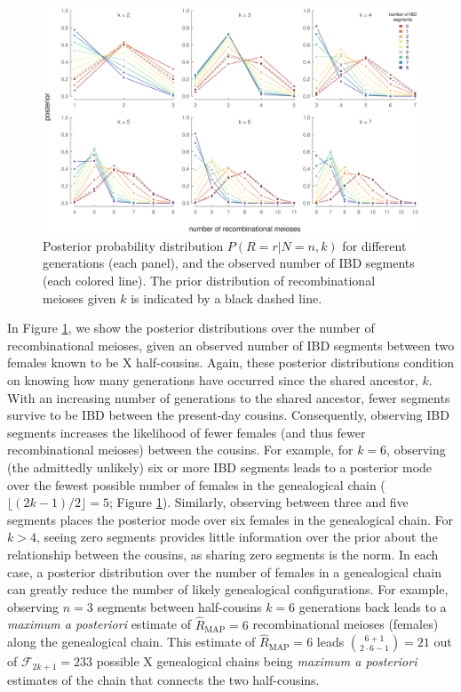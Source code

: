 \documentclass[11pt]{article}
\begin{document}
\begin{figure}[!ht]

  \includegraphics[width=\textwidth]{images/rm-posterior}

  \caption{Posterior probability distribution $P(R = r | N = n, k)$ for
different generations (each panel), and the observed number of IBD segments
(each colored line). The prior distribution of recombinational meioses given
$k$ is indicated by a black dashed line.}

  \label{fig:inference}

\end{figure}

In Figure \ref{fig:inference}, we show the posterior distributions over the
number of recombinational meioses, given an observed number of IBD segments
between two females known to be X half-cousins. Again, these posterior
distributions condition on knowing how many generations have occurred since the
shared ancestor, $k$.  With an increasing number of generations to the shared
ancestor, fewer segments survive to be IBD between the present-day cousins.
Consequently, observing IBD segments increases the likelihood of fewer females
(and thus fewer recombinational meioses) between the cousins. For example, for
$k=6$, observing (the admittedly unlikely) six or more IBD segments leads to a
posterior mode over the fewest possible number of females in the genealogical
chain ($\lfloor (2k-1)/2 \rfloor = 5$; Figure \ref{fig:inference}).  Similarly,
observing between three and five segments places the posterior mode over six
females in the genealogical chain. For $k>4$, seeing zero segments provides
little information over the prior about the relationship between the cousins,
as sharing zero segments is the norm. In each case, a posterior distribution
over the number of females in a genealogical chain can greatly reduce the
number of likely genealogical configurations. For example, observing $n=3$
segments between half-cousins $k=6$ generations back leads to a \emph{maximum a
posteriori} estimate of $\hat{R}_{\text{MAP}} = 6$ recombinational meioses
(females) along the genealogical chain. This estimate of $\hat{R}_{\text{MAP}}
= 6$ leads ${6 + 1 \choose 2\cdot6 - 1} = 21$ out of $\mathcal{F}_{2k+1} = 233$
possible X genealogical chains being \emph{maximum a posteriori} estimates of
the chain that connects the two half-cousins.
\end{document}
